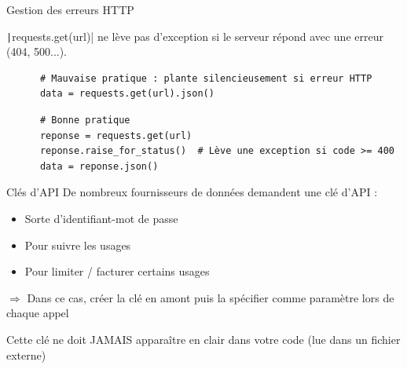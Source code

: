 \documentclass[10pt]{beamer}
\begin{document}
\begin{frame}[fragile]{Gestion des erreurs HTTP}

  \texttt|requests.get(url)| ne lève \alert{pas d'exception} si le serveur répond avec une erreur (404, 500...).

  \begin{beamercodeblock}
    \begin{verbatim}
      # Mauvaise pratique : plante silencieusement si erreur HTTP
      data = requests.get(url).json()
    \end{verbatim}
  \end{beamercodeblock}

  \pause

  \begin{beamercodeblock}
    \begin{verbatim}
      # Bonne pratique
      reponse = requests.get(url)
      reponse.raise_for_status()  # Lève une exception si code >= 400
      data = reponse.json()
    \end{verbatim}
  \end{beamercodeblock}
\end{frame}





\begin{frame}{Clés d'API}
  De nombreux fournisseurs de données demandent une clé d'API :
  \begin{itemize}
    \item Sorte d'identifiant-mot de passe
    \item Pour suivre les usages
    \item Pour limiter / facturer certains usages
  \end{itemize}

  $\Rightarrow$ Dans ce cas, créer la clé en amont puis la spécifier comme paramètre lors de chaque appel

  \pause

  \alert{Cette clé ne doit JAMAIS apparaître en clair dans votre code (lue dans un fichier externe)}

\end{frame}
\end{document}
